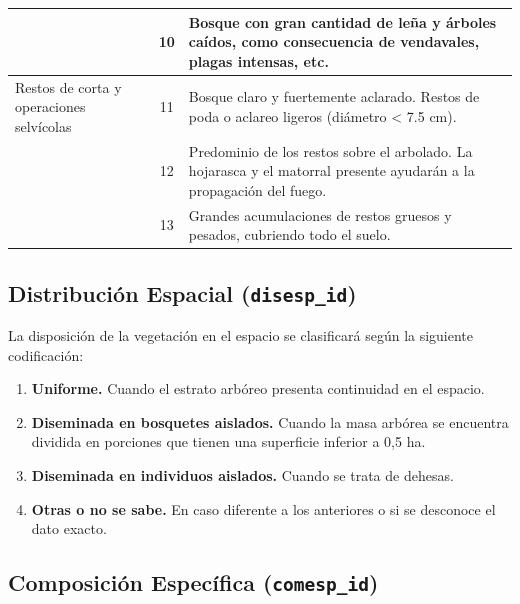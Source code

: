 \begin{longtable}{|p{2.5cm}|c|p{9cm}|}
                                             & 10            & Bosque con gran cantidad de leña y árboles caídos, como consecuencia de vendavales, plagas intensas, etc.                                                                               \\
    \hline
    Restos de corta y operaciones selvícolas & 11            & Bosque claro y fuertemente aclarado. Restos de poda o aclareo ligeros (diámetro < 7.5 cm).                                                                                              \\
                                             & 12            & Predominio de los restos sobre el arbolado. La hojarasca y el matorral presente ayudarán a la propagación del fuego.                                                                    \\
                                             & 13            & Grandes acumulaciones de restos gruesos y pesados, cubriendo todo el suelo.                                                                                                             \\
\end{longtable}
\normalsize


\subsection{Distribución Espacial (\texttt{disesp\_id})}\label{sec:disEsp}

La disposición de la vegetación en el espacio se clasificará según la siguiente codificación:

\begin{enumerate}
    \item \textbf{Uniforme.} Cuando el estrato arbóreo presenta continuidad en el espacio.

    \item \textbf{Diseminada en bosquetes aislados.} Cuando la masa arbórea se encuentra dividida en porciones que tienen una superficie inferior a 0,5 ha.

    \item \textbf{Diseminada en individuos aislados.} Cuando se trata de dehesas.

    \item[9.] \textbf{Otras o no se sabe.} En caso diferente a los anteriores o si se desconoce el dato exacto.
\end{enumerate}


\subsection{Composición Específica (\texttt{comesp\_id})}\label{anexo:compesp}

